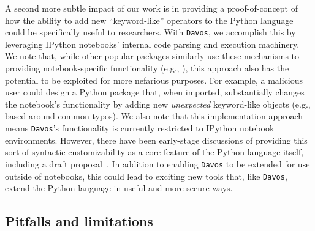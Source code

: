 \documentclass[preprint,12pt,a4paper]{elsarticle}
\begin{document}
A second more subtle impact of our work is in providing a
proof-of-concept of how the ability to add new ``keyword-like''
operators to the Python language could be specifically useful to
researchers. With \texttt{Davos}, we accomplish this by leveraging
IPython notebooks' internal code parsing and execution machinery. We
note that, while other popular packages similarly use these mechanisms
to providing notebook-specific functionality (e.g.,
\cite{Hunt07,HeusEtal18}), this approach also has the potential to be
exploited for more nefarious purposes. For example, a malicious user
could design a Python package that, when imported, substantially
changes the notebook's functionality by adding new \textit{unexpected}
keyword-like objects (e.g., based around common typos). We also note
that this implementation approach means \texttt{Davos}'s functionality
is currently restricted to IPython notebook environments. However,
there have been early-stage discussions of providing this sort of
syntactic customizability as a core feature of the Python language itself,
including a draft proposal~\cite{Shan20}. In addition to enabling
\texttt{Davos} to be extended for use outside of notebooks, this could
lead to exciting new tools that, like \texttt{Davos}, extend the
Python language in useful and more secure ways.

\subsection{Pitfalls and limitations}
\end{document}
